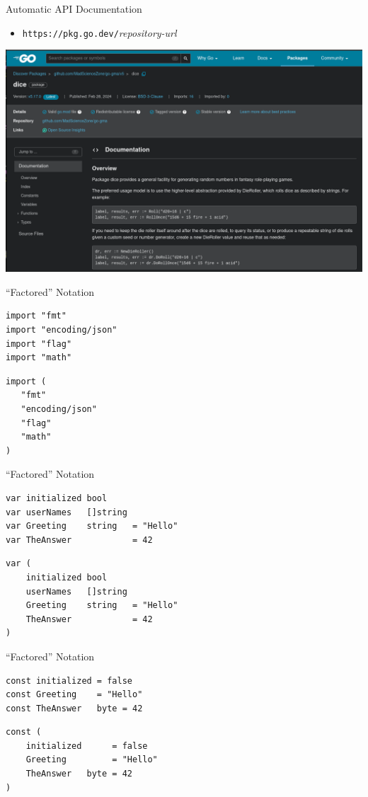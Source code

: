 \documentclass[pdf]{beamer}
\newcommand\z[1]{\texttt{#1}}
\begin{document}
\begin{frame}{Automatic API Documentation}
\begin{itemize}
\item\z{https://pkg.go.dev/}\emph{repository-url}
\end{itemize}
	\begin{center}
		\includegraphics[width=\textwidth]{docsite}
	\end{center}
\end{frame}

\begin{frame}[fragile]{``Factored'' Notation}
\begin{lstlisting}
import "fmt"
import "encoding/json"
import "flag"
import "math"
\end{lstlisting}
\pause
\begin{lstlisting}
import (
   "fmt"
   "encoding/json"
   "flag"
   "math"
)
\end{lstlisting}
\end{frame}

\begin{frame}[fragile]{``Factored'' Notation}
\begin{lstlisting}
var initialized bool
var userNames   []string
var Greeting    string   = "Hello"
var TheAnswer            = 42
\end{lstlisting}
\begin{lstlisting}
var (
    initialized bool
    userNames   []string
    Greeting    string   = "Hello"
    TheAnswer            = 42
)
\end{lstlisting}
\end{frame}

\begin{frame}[fragile]{``Factored'' Notation}
\begin{lstlisting}
const initialized = false
const Greeting    = "Hello"
const TheAnswer   byte = 42
\end{lstlisting}
\begin{lstlisting}
const (
    initialized      = false
    Greeting         = "Hello"
    TheAnswer   byte = 42
)
\end{lstlisting}
\end{frame}
\end{document}
